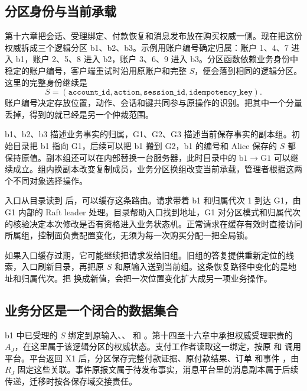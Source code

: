 \subsection*{分区身份与当前承载}

第十六章把会话、受理绑定、付款恢复和消息发布放在购买权威一侧。现在把这份权威拆成三个逻辑分区 b1、b2、b3。示例用账户编号确定归属：账户 1、4、7 进入 b1，账户 2、5、8 进入 b2，账户 3、6、9 进入 b3。分区函数依赖业务身份中稳定的账户编号，客户端重试时沿用原账户和完整 $S$，便会落到相同的逻辑分区。这里的完整身份继续是
\[
S=(\texttt{account\_id},\texttt{action},
   \texttt{session\_id},\texttt{idempotency\_key}) .
\]
账户编号决定存放位置，动作、会话和键共同参与原操作的识别。把其中一个分量丢掉，得到的就已经是另一个仲裁范围。

b1、b2、b3 描述业务事实的归属，G1、G2、G3 描述当前保存事实的副本组。初始目录把 b1 指向 G1，后续可以把 b1 搬到 G2，b1 的编号和 Alice 保存的 $S$ 都保持原值。副本组还可以在内部替换一台服务器，此时目录中的 $\mathrm{b1}\to\mathrm{G1}$ 可以继续成立。组内换副本改变复制成员，业务分区换组改变当前承载，管理者根据这两个不同对象选择操作。


入口从目录读到  后，可以缓存这条路由。请求带着 b1 和归属代次 1 到达 G1，由 G1 内部的 Raft leader 处理。目录帮助入口找到地址，G1 对分区模式和归属代次的核验决定本次修改是否有资格进入业务状态机。正常请求在缓存有效时直接访问所属组，控制面负责配置变化，无须为每一次购买分配一把全局锁。

如果入口缓存过期，它可能继续把请求发给旧组。旧组的答复提供重新定位的线索，入口刷新目录，再把原 $S$ 和原输入送到当前组。这条恢复路径中变化的是地址和归属代次。把  换成新值，会把一次位置变化扩大成另一项业务操作。

\subsection*{业务分区是一个闭合的数据集合}

b1 中已受理的 $S$ 绑定到原输入、、 和 。第十四至十六章中承担权威受理职责的 $A_J$，在这里属于该逻辑分区的权威状态。支付工作者读取这一绑定，按原  和  调用平台。平台返回 X1 后，分区保存完整付款证据、原付款结果、订单  和事件 ，由 $R_J$ 固定这些关联。事件原报文属于待发布事实，消息平台里的消息副本属于后续传递，迁移时按各保存域交接责任。

